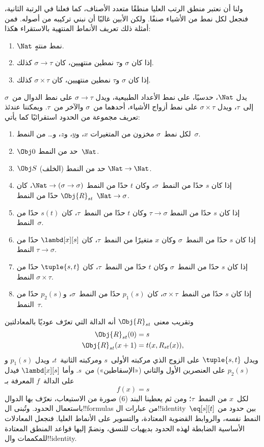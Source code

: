 \documentclass[../../../include/open-logic-section]{subfiles}
\begin{document}
ولنا أن نعتبر منطق الرتب العليا منطقًا متعدد الأصناف، كما
فعلنا في الرتبة الثانية، فنجعل لكل نمط من الأشياء صنفًا.
ولكن الأبين غالبًا أن نبني تركيبه من أصوله. فمن أمثلة ذلك
تعريف الأنماط المنتهية بالاستقراء هكذا:
\begin{enumerate}
\item $\Nat$ نمط منتهٍ.
\item إذا كان $\sigma$ و$\tau$ نمطين منتهيين، كان $\sigma
  \to \tau$ كذلك.
\item إذا كان $\sigma$ و$\tau$ نمطين منتهيين، كان $\sigma \times
  \tau$ كذلك.
\end{enumerate}
يدل $\Nat$، حدسيًا، على نمط الأعداد الطبيعية، ويدل $\sigma \to
\tau$ على نمط الدوال من~$\sigma$ إلى~$\tau$، ويدل $\sigma \times
\tau$ على نمط أزواج الأشياء، أحدهما من~$\sigma$ والآخر من~$\tau$.
ويمكننا عندئذ تعريف مجموعة من الحدود استقرائيًا كما يأتي:
\begin{enumerate}
\item لكل نمط~$\sigma$ مخزون من المتغيرات $x$، و$y$، و$z$، و\dots
  من النمط~$\sigma$.
\item $\Obj 0$ حد من النمط~$\Nat$.
\item $\Obj S$ (الخلف) حد من النمط $\Nat \to \Nat$.
\item إذا كان $s$ حدًا من النمط~$\sigma$، وكان $t$ حدًا من النمط
  $\Nat \to (\sigma \to \sigma)$، كان $\Obj{R}_{st}$ حدًا من النمط
  $\Nat \to \sigma$.
\item إذا كان $s$ حدًا من النمط $\tau \to \sigma$ وكان $t$ حدًا من
  النمط~$\tau$، كان $s(t)$ حدًا من النمط~$\sigma$.
\item إذا كان $s$ حدًا من النمط~$\sigma$ وكان $x$ متغيرًا من
  النمط~$\tau$، كان $\lambd[x][s]$ حدًا من النمط $\tau \to \sigma$.
\item إذا كان $s$ حدًا من النمط~$\sigma$ وكان $t$ حدًا من
  النمط~$\tau$، كان $\tuple{s, t}$ حدًا من النمط $\sigma \times
  \tau$.
\item إذا كان $s$ حدًا من النمط~$\sigma \times \tau$، كان $p_1(s)$
  حدًا من النمط~$\sigma$، و$p_2(s)$ حدًا من النمط~$\tau$.
\end{enumerate}
وتقريب معنى $\Obj{R}_{st}$ أنه الدالة التي تعرّف عوديًا بالمعادلتين
\begin{align*}
\Obj{R}_{st}(0) & = s \\
\Obj{R}_{st}(x+1) & = t(x, R_{st}(x)),
\end{align*}
ويدل $\tuple{s, t}$ على الزوج الذي مركبته الأولى~$s$ ومركبته
الثانية~$t$، ويدل $p_1(s)$ و$p_2(s)$ على العنصرين الأول والثاني
(«الإسقاطين») من~$s$. وأما $\lambd[x][s]$ فيدل على الدالة~$f$
المعرفة بـ
\[
f(x) = s
\]
لكل~$x$ من النمط~$\tau$؛ ومن ثم يعطينا البند (6) صورة من الاستيعاب،
نعرّف بها الدوال باستعمال الحدود. وتُبنى ال!!{formula}s من
عبارات ال!!{identity}~$\eq[s][t]$ بين حدود من النمط نفسه، والروابط
القضوية المعتادة، والتسوير على الأنماط العليا. فنجعل
المعادلات الأساسية الضابطة لهذه الحدود بديهيات للنسق، ونضمّ إليها
قواعد المنطق المعتادة للمكممات وال!!{identity}.
\end{document}
